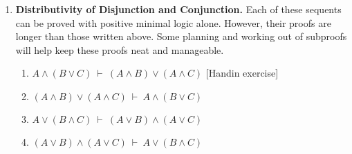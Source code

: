 \documentclass[11pt]{report}
\begin{document}
\begin{enumerate}
	\item \textbf{Distributivity of Disjunction and Conjunction.} Each of these sequents can be proved with positive minimal logic alone. However, their proofs are longer than those written above. Some planning and working out of subproofs will help keep these proofs neat and manageable. 

	\begin{enumerate}
		\item $A \land (B \lor C) \ \vdash \ (A \land B) \lor (A \land C)$ \hfill [Handin exercise]
		\item $(A \land B) \lor (A \land C) \ \vdash \ A \land (B \lor C)$
		\item $A \lor (B \land C) \ \vdash \ (A \lor B) \land (A \lor C)$
		\item $(A \lor B) \land (A \lor C) \ \vdash \ A \lor (B \land C)$
	\end{enumerate}



\end{enumerate}	
\end{document}

